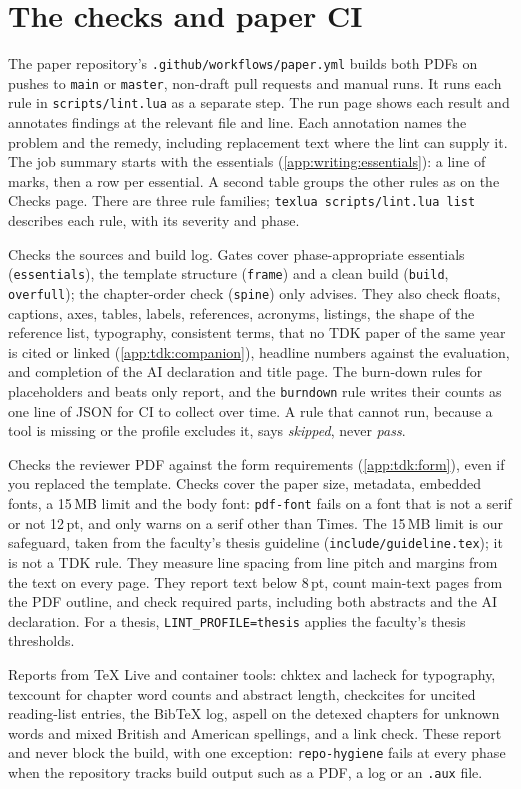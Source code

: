 \section{The checks and paper CI}\label{app:code:paperci}
The paper repository's \texttt{.github/workflows/paper.yml} builds both PDFs on pushes to \texttt{main} or \texttt{master}, non-draft pull requests and manual runs. It runs each rule in \texttt{scripts/lint.lua} as a separate step. The run page shows each result and annotates findings at the relevant file and line. Each annotation names the problem and the remedy, including replacement text where the lint can supply it. The job summary starts with the essentials (\cref{app:writing:essentials}): a line of marks, then a row per essential. A second table groups the other rules as on the Checks page. There are three rule families; \texttt{texlua scripts/lint.lua list} describes each rule, with its severity and phase.
\begin{description}[noitemsep]
  \item[source] Checks the sources and build log. Gates cover phase-appropriate essentials (\texttt{essentials}), the template structure (\texttt{frame}) and a clean build (\texttt{build}, \texttt{overfull}); the chapter-order check (\texttt{spine}) only advises. They also check floats, captions, axes, tables, labels, references, acronyms, listings, the shape of the reference list, typography, consistent terms, that no TDK paper of the same year is cited or linked (\cref{app:tdk:companion}), headline numbers against the evaluation, and completion of the AI declaration and title page. The burn-down rules for placeholders and beats only report, and the \texttt{burndown} rule writes their counts as one line of JSON for CI to collect over time. A rule that cannot run, because a tool is missing or the profile excludes it, says \emph{skipped}, never \emph{pass}.
  \item[pdf] Checks the reviewer PDF against the form requirements (\cref{app:tdk:form}), even if you replaced the template. Checks cover the paper size, metadata, embedded fonts, a 15\,MB limit and the body font: \texttt{pdf-font} fails on a font that is not a serif or not 12\,pt, and only warns on a serif other than Times. The 15\,MB limit is our safeguard, taken from the faculty's thesis guideline (\texttt{include/guideline.tex}); it is not a TDK rule. They measure line spacing from line pitch and margins from the text on every page. They report text below 8\,pt, count main-text pages from the PDF outline, and check required parts, including both abstracts and the AI declaration. For a thesis, \texttt{LINT\_PROFILE=thesis} applies the faculty's thesis thresholds.
  \item[tools] Reports from TeX Live and container tools: chktex and lacheck for typography, texcount for chapter word counts and abstract length, checkcites for uncited reading-list entries, the BibTeX log, aspell on the detexed chapters for unknown words and mixed British and American spellings, and a link check. These report and never block the build, with one exception: \texttt{repo-hygiene} fails at every phase when the repository tracks build output such as a PDF, a log or an \texttt{.aux} file.
\end{description}
